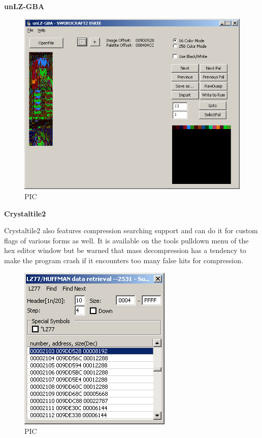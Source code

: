\documentclass[
]{book}
\begin{document}
\textbf{unLZ-GBA}

\begin{figure}
\centering
\includegraphics{images/187_home_fast6191_romhackingguide_unrenamed_fil___mhackingguidecompressionsearching_unLZGBA_1.png}
\caption{PIC}
\end{figure}

\textbf{Crystaltile2}

Crystaltile2 also features compression searching support and can do it for custom flags of various forms as well. It is available on the tools pulldown menu of the hex editor window but be warned that mass decompression has a tendency to make the program crash if it encounters too many false hits for compression.

\begin{figure}
\centering
\includegraphics{images/188_home_fast6191_romhackingguide_unrenamed_fil___ingguidecompressionsearching_crystaltile2_1.png}
\caption{PIC}
\end{figure}
\end{document}

